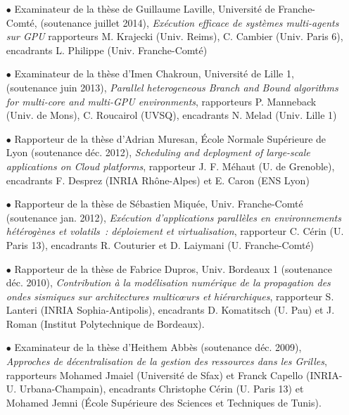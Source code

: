 \documentclass[11pt]{article}
\begin{document}
\begin{itemize}
\item[$\bullet$] 
Examinateur de la thèse de Guillaume Laville, Université de Franche-Comté,
(soutenance juillet 2014), \textit{Exécution efficace de systèmes multi-agents
  sur GPU}
rapporteurs M. Krajecki (Univ. Reims), C. Cambier (Univ. Paris 6), 
encadrants L. Philippe (Univ. Franche-Comté)\\

\item[$\bullet$] 
Examinateur de la thèse d'Imen Chakroun, Université de Lille 1,
(soutenance juin 2013), \textit{Parallel heterogeneous Branch and Bound algorithms for multi-core and multi-GPU environments},
rapporteurs P. Manneback (Univ. de Mons), C. Roucairol (UVSQ), 
encadrants N. Melad (Univ. Lille 1)\\

\item[$\bullet$] 
Rapporteur de la thèse d'Adrian Muresan, \'Ecole Normale Supérieure de Lyon
(soutenance déc. 2012), \textit{Scheduling and deployment of large-scale applications on 
Cloud platforms},
rapporteur J. F. Méhaut (U. de Grenoble), 
encadrants F. Desprez (INRIA Rhône-Alpes) et E. Caron (ENS Lyon)\\
\item[$\bullet$] 
Rapporteur de la thèse de Sébastien Miquée, Univ. Franche-Comté (soutenance 
jan. 2012), \textit{Exécution d'applications parallèles en environnements 
hétérogènes et volatils~: déploiement et virtualisation},
rapporteur C. Cérin (U. Paris 13), 
encadrants R. Couturier et D. Laiymani (U. Franche-Comté)\\
\item[$\bullet$] 
Rapporteur de la thèse de Fabrice Dupros, Univ. Bordeaux 1 (soutenance déc. 2010), 
\textit{Contribution à la modélisation numérique de la propagation des ondes 
sismiques sur architectures multic{\oe}urs et hiérarchiques},
rapporteur S. Lanteri (INRIA Sophia-Antipolis), 
encadrants D. Komatitsch (U. Pau) et J. Roman (Institut Polytechnique de 
Bordeaux).\\

\item[$\bullet$] 
Examinateur de la thèse d'Heithem Abbès (soutenance déc. 2009), 
\textit{Approches de décentralisation de la gestion des ressources dans les 
Grilles}, rapporteurs Mohamed Jmaiel (Université de Sfax) et Franck Capello 
(INRIA-U. Urbana-Champain), encadrants Christophe Cérin (U. Paris 13) et 
Mohamed Jemni (École Supérieure des Sciences et Techniques de Tunis).
\end{itemize}
\end{document}
